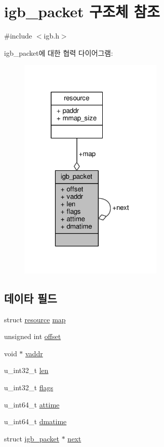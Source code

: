 \hypertarget{structigb__packet}{}\section{igb\+\_\+packet 구조체 참조}
\label{structigb__packet}


{\ttfamily \#include $<$igb.\+h$>$}



igb\+\_\+packet에 대한 협력 다이어그램\+:
\nopagebreak
\begin{figure}[H]
\begin{center}
\leavevmode
\includegraphics[width=196pt]{structigb__packet__coll__graph}
\end{center}
\end{figure}
\subsection*{데이타 필드}
\begin{DoxyCompactItemize}
\item 
struct \hyperlink{structresource}{resource} \hyperlink{structigb__packet_a1134ed5d4a74917c76b796e82cd4206f}{map}
\item 
unsigned int \hyperlink{structigb__packet_a29b5297d3393519050e3126c4cb07c1c}{offset}
\item 
void $\ast$ \hyperlink{structigb__packet_aa0bb68874ee9bcccfa45212ec3b12466}{vaddr}
\item 
u\+\_\+int32\+\_\+t \hyperlink{structigb__packet_a0c5f469bd681fb46e6f4203d5338e99f}{len}
\item 
u\+\_\+int32\+\_\+t \hyperlink{structigb__packet_a38a8a1678784eecc1ffcc0685dbcce97}{flags}
\item 
u\+\_\+int64\+\_\+t \hyperlink{structigb__packet_a7f67203ca8a69ba9e8d49e1233601ff6}{attime}
\item 
u\+\_\+int64\+\_\+t \hyperlink{structigb__packet_a72ee6ebc78f9345554cf78b10226b87f}{dmatime}
\item 
struct \hyperlink{structigb__packet}{igb\+\_\+packet} $\ast$ \hyperlink{structigb__packet_a1a20432d28f575630a2562c1c728a40f}{next}
\end{DoxyCompactItemize}



